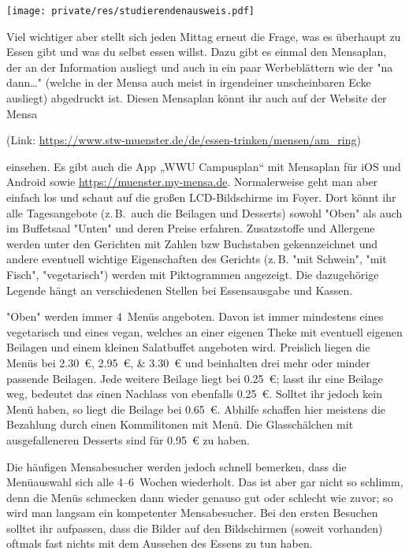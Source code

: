 \begin{multicols*}{2}
\begin{center}
	\texttt{[image: private/res/studierendenausweis.pdf]}
\end{center}

Viel wichtiger aber stellt sich jeden Mittag erneut die Frage, was es überhaupt zu Essen gibt und was du selbst essen willst.
Dazu gibt es einmal den Mensaplan, der an der Information ausliegt und auch in ein paar Werbeblättern wie der "na dann\dots" (welche in der Mensa auch meist in irgendeiner unscheinbaren Ecke ausliegt) abgedruckt ist.
Diesen Mensaplan könnt ihr auch auf der Website der Mensa

\begin{center}
	(Link:
	\url{https://www.stw-muenster.de/de/essen-trinken/mensen/am_ring})
\end{center}

einsehen.
Es gibt auch die App „WWU Campusplan“ mit Mensaplan für iOS und Android sowie \url{https://muenster.my-mensa.de}. Normalerweise geht man aber einfach los und schaut auf die
großen LCD-Bildschirme im Foyer. Dort könnt ihr alle Tagesangebote (z.\,B.\ auch die Beilagen und Desserts) sowohl "Oben" als auch im Buffetsaal "Unten" und deren Preise erfahren. Zusatzstoffe und Allergene werden unter den Gerichten mit Zahlen bzw Buchstaben gekennzeichnet und andere eventuell wichtige Eigenschaften des Gerichts (z.\,B. "mit Schwein", "mit Fisch", "vegetarisch") werden mit Piktogrammen angezeigt. Die dazugehörige Legende hängt an verschiedenen Stellen bei Essensausgabe und Kassen.

"Oben" werden immer 4~Menüs angeboten. Davon ist immer mindestens eines vegetarisch und eines vegan, welches an einer eigenen Theke mit eventuell eigenen Beilagen und einem kleinen Salatbuffet angeboten wird.
Preislich liegen die Menüs bei \SIlist{2,30; 2,95; 3,30}{\euro} und beinhalten drei mehr oder minder passende Beilagen.
Jede weitere Beilage liegt bei \SI{0,25}{\euro}; lasst ihr eine Beilage weg, bedeutet das einen Nachlass von ebenfalls \SI{0,25}{\euro}.
Solltet ihr jedoch kein Menü haben, so liegt die Beilage bei \SI{0,65}{\euro}.
Abhilfe schaffen hier meistens die Bezahlung durch einen Kommilitonen mit Menü.
Die Glasschälchen mit ausgefalleneren Desserts sind für \SI{0,95}{\euro} zu haben.


Die häufigen Mensabesucher werden jedoch schnell bemerken, dass die Menüauswahl sich alle 4--6~Wochen wiederholt.
Das ist aber gar nicht so schlimm, denn die Menüs schmecken dann wieder genauso gut oder schlecht wie zuvor; so wird man langsam ein kompetenter Mensabesucher.
Bei den ersten Besuchen solltet ihr aufpassen, dass die Bilder auf den Bildschirmen (soweit vorhanden) oftmals fast nichts mit dem Aussehen des Essens zu tun haben.


\end{multicols*}
